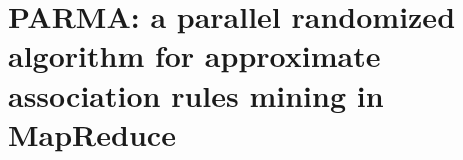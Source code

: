 \chapter{PARMA: a parallel randomized algorithm for approximate association
rules mining in MapReduce}\label{ch:parma}

\iffalse
\begin{abstract}


\end{abstract}
